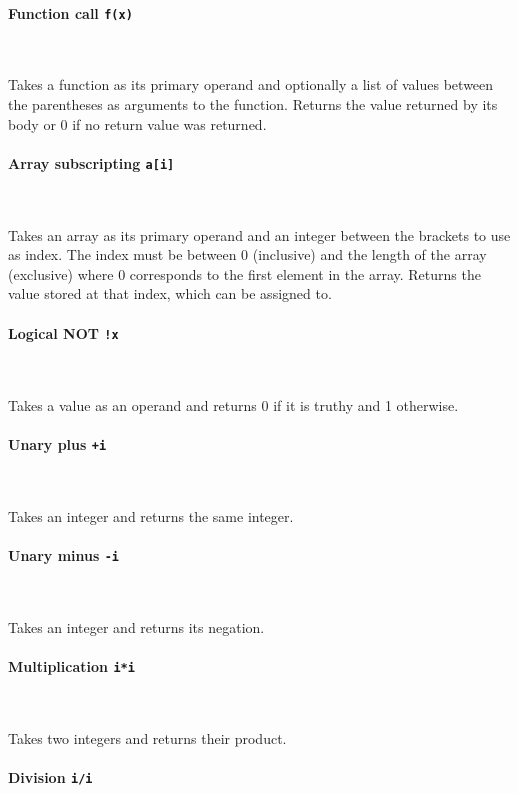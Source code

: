 \paragraph{Function call \quad \texttt{f(x)}} \

Takes a function as its primary operand and optionally a list of values between the parentheses as arguments to the function. Returns the value returned by its body or 0 if no return value was returned.

\paragraph{Array subscripting \quad \texttt{a[i]}} \

Takes an array as its primary operand and an integer between the brackets to use as index. The index must be between 0 (inclusive) and the length of the array (exclusive) where 0 corresponds to the first element in the array. Returns the value stored at that index, which can be assigned to.

\paragraph{Logical NOT \quad \texttt{!x}} \

Takes a value as an operand and returns 0 if it is truthy and 1 otherwise.

\paragraph{Unary plus \quad \texttt{+i}} \

Takes an integer and returns the same integer.

\paragraph{Unary minus \quad \texttt{-i}} \

Takes an integer and returns its negation.

\paragraph{Multiplication \quad \texttt{i*i}} \

Takes two integers and returns their product.

\paragraph{Division \quad \texttt{i/i}} \

